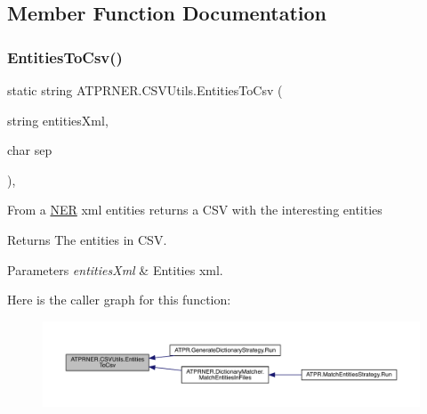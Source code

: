 \subsection{Member Function Documentation}
\hypertarget{class_a_t_p_r_n_e_r_1_1_c_s_v_utils_a6d40fcdbc82ad0745e7f47ace6695f8a}{}\label{class_a_t_p_r_n_e_r_1_1_c_s_v_utils_a6d40fcdbc82ad0745e7f47ace6695f8a} 
\subsubsection{\texorpdfstring{Entities\+To\+Csv()}{EntitiesToCsv()}}
{\footnotesize\ttfamily static string A\+T\+P\+R\+N\+E\+R.\+C\+S\+V\+Utils.\+Entities\+To\+Csv (\begin{DoxyParamCaption}\item[{string}]{entities\+Xml,  }\item[{char}]{sep }\end{DoxyParamCaption})\hspace{0.3cm}{\ttfamily [inline]}, {\ttfamily [static]}}



From a \hyperlink{class_a_t_p_r_n_e_r_1_1_n_e_r}{N\+ER} xml entities returns a C\+SV with the interesting entities 

\begin{DoxyReturn}{Returns}
The entities in C\+SV.
\end{DoxyReturn}

\begin{DoxyParams}{Parameters}
{\em entities\+Xml} & Entities xml.\\
\hline
\end{DoxyParams}
Here is the caller graph for this function\+:
\nopagebreak
\begin{figure}[H]
\begin{center}
\leavevmode
\includegraphics[width=350pt]{d7/d1f/class_a_t_p_r_n_e_r_1_1_c_s_v_utils_a6d40fcdbc82ad0745e7f47ace6695f8a_icgraph}
\end{center}
\end{figure}
\hypertarget{class_a_t_p_r_n_e_r_1_1_c_s_v_utils_a377f7a74bf9bb2672f1669f6d562cd67}{}\label{class_a_t_p_r_n_e_r_1_1_c_s_v_utils_a377f7a74bf9bb2672f1669f6d562cd67} 
